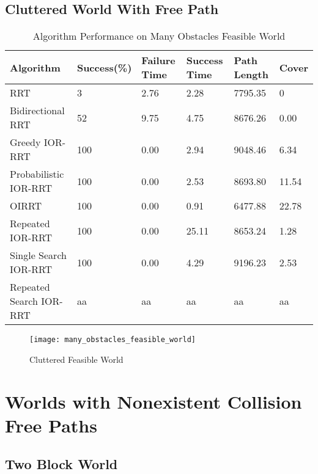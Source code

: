 \subsection{Cluttered World With Free Path}

\begin{table}
\begin{tabular}{@{}llllll@{}}
\toprule
Algorithm & Success(\%)  & Failure Time  & Success Time  & Path Length & Cover\\ 
\midrule
RRT & 3 & 2.76 & 2.28 & 7795.35 & 0 \\
Bidirectional RRT & 52 & 9.75 & 4.75 & 8676.26 & 0.00 \\
Greedy IOR-RRT & 100 & 0.00 & 2.94 & 9048.46 & 6.34 \\
Probabilistic IOR-RRT & 100 & 0.00 & 2.53 & 8693.80 & 11.54 \\
OIRRT & 100 & 0.00 & 0.91 & 6477.88 & 22.78 \\
Repeated IOR-RRT & 100 & 0.00 & 25.11 & 8653.24 & 1.28 \\
Single Search IOR-RRT & 100 & 0.00 & 4.29 & 9196.23 & 2.53 \\
Repeated Search IOR-RRT & aa & aa & aa & aa & aa \\
\bottomrule
\end{tabular}
\caption{Algorithm Performance on Many Obstacles Feasible World}
\label{tab:many_obstacles_feasible_world}
\end{table}

\begin{figure}[h]
    \centering
    \texttt{[image: many\_obstacles\_feasible\_world]}
    \caption{Cluttered Feasible World}
    \label{fig:many_obstacles_feasible_world}
\end{figure}

\section{Worlds with Nonexistent Collision Free Paths}

\subsection{Two Block World}

